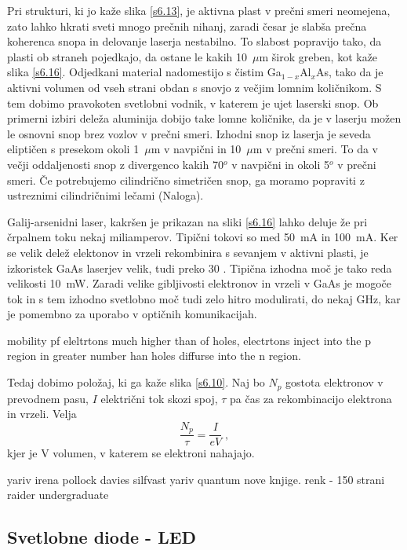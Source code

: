 Pri strukturi, ki jo kaže slika \ref{s6.13}, je aktivna plast v prečni
smeri neomejena, zato lahko hkrati sveti mnogo prečnih nihanj, zaradi
česar je slabša prečna koherenca snopa in delovanje laserja nestabilno.
To slabost popravijo tako, da plasti ob straneh pojedkajo, da ostane le
kakih 10~$\mu$m širok greben, kot kaže slika \ref{s6.16}. Odjedkani
material nadomestijo s čistim Ga$_{1-x}$Al$_x$As, tako da je aktivni
volumen od vseh strani obdan s snovjo z večjim lomnim količnikom. S tem
dobimo pravokoten svetlobni vodnik, v katerem je ujet laserski snop. Ob
primerni izbiri deleža aluminija dobijo take lomne količnike, da je v
laserju možen le osnovni snop brez vozlov v prečni smeri. Izhodni snop iz
laserja je seveda eliptičen s presekom okoli 1~$\mu$m v navpični in 10~$\mu
$m v prečni smeri. To da v večji oddaljenosti snop z divergenco kakih 70$^o
$ v navpični in okoli 5$^o$ v prečni smeri. Če potrebujemo cilindrično
simetričen snop, ga moramo popraviti z ustreznimi cilindričnimi lečami
(Naloga).

Galij-arsenidni laser, kakršen je prikazan na sliki \ref{s6.16} lahko
deluje že pri črpalnem toku nekaj miliamperov. Tipični tokovi so med
50~mA in 100~mA. Ker se velik delež elektonov in vrzeli rekombinira s
sevanjem v aktivni plasti, je izkoristek GaAs laserjev velik, tudi preko 30
. Tipična izhodna moč je tako reda velikosti
10~mW. Zaradi velike gibljivosti elektronov in vrzeli v GaAs je mogoče tok
in s tem izhodno svetlobno moč tudi zelo hitro modulirati, do nekaj GHz,
kar je pomembno za uporabo v optičnih komunikacijah.




mobility pf eleltrtons much higher than of holes, electrtons inject into the 
p region in greater number han holes diffurse into the n region. 

Tedaj dobimo položaj, ki ga
kaže slika \ref{s6.10}. Naj bo $N_p$ gostota elektronov v prevodnem pasu, $I
$ električni tok skozi spoj, $\tau$ pa čas za rekombinacijo elektrona in
vrzeli. Velja 
\begin{equation}  \label{6.2}
\frac{N_p}{\tau}=\frac{I}{e V}\;,
\end{equation}
kjer je V volumen, v katerem se elektroni nahajajo.

yariv
irena
pollock
davies
silfvast
yariv quantum
nove knjige.
renk - 150 strani
raider
undergraduate

\subsection{Svetlobne diode - LED}
